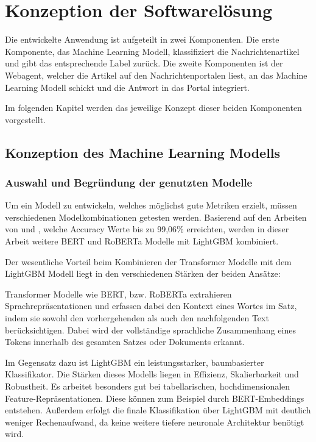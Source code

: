 \chapter{Konzeption der Softwarelösung}
\label{chap:konzeption_der_softwareloesung}

Die entwickelte Anwendung ist aufgeteilt in zwei Komponenten. Die erste Komponente, das Machine Learning Modell,
klassifiziert die Nachrichtenartikel und gibt das entsprechende Label zurück. Die zweite Komponenten ist der Webagent, welcher
die Artikel auf den Nachrichtenportalen liest, an das Machine Learning Modell schickt und die Antwort in das Portal integriert.

Im folgenden Kapitel werden das jeweilige Konzept dieser beiden Komponenten vorgestellt.

\section{Konzeption des Machine Learning Modells} \label{sec:06:machine_learning_model}

\subsection{Auswahl und Begründung der genutzten Modelle} 

Um ein Modell zu entwickeln, welches möglichst gute Metriken erzielt, müssen verschiedenen Modelkombinationen getesten werden.
Basierend auf den Arbeiten von \cite{Essa:2023aa} und \cite{V_G_2024}, welche Accuracy Werte bis zu 99,06\% erreichten, werden in dieser Arbeit weitere BERT und RoBERTa
Modelle mit LightGBM kombiniert.

Der wesentliche Vorteil beim Kombinieren der Transformer Modelle mit dem LightGBM Modell liegt in den verschiedenen Stärken der beiden Ansätze:

Transformer Modelle wie BERT, bzw. RoBERTa extrahieren Sprachrepräsentationen und erfassen dabei den Kontext
eines Wortes im Satz, indem sie sowohl den vorhergehenden als auch den nachfolgenden Text berücksichtigen.
Dabei wird der vollständige sprachliche Zusammenhang eines Tokens innerhalb des gesamten Satzes oder Dokuments erkannt.

Im Gegensatz dazu ist LightGBM ein leistungsstarker, baumbasierter Klassifikator. Die Stärken dieses Modells liegen in Effizienz, Skalierbarkeit und Robustheit.
Es arbeitet besonders gut bei tabellarischen, hochdimensionalen Feature-Repräsentationen. 
Diese können zum Beispiel durch BERT-Embeddings entstehen.
Außerdem erfolgt die finale Klassifikation über LightGBM mit deutlich weniger Rechenaufwand, da keine weitere tiefere neuronale Architektur benötigt wird.

